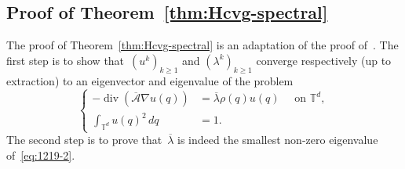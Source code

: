 \documentclass{article}
\renewcommand{\geq}{\geqslant}
\def\T{\mathbb{T}}
\renewcommand{\dim}{d}
\begin{document}
\subsection{Proof of Theorem~\ref{thm:Hcvg-spectral}}
\label{app:thm:Hcvg-spectral}

The proof of Theorem~\ref{thm:Hcvg-spectral} is an adaptation of the proof of~\cite[Theorem~1.3.16]{allaire_homogeneisation}. The first step is to show that~$(u^k)_{k \geq 1}$ and $(\lambda^k)_{k \geq 1}$ converge respectively (up to extraction) to an eigenvector and eigenvalue of the problem
\begin{equation}
  \label{eq:1219-2}
  \left\{\begin{aligned}
  -\operatorname{div}\left(\overline{\mathcal{A}}\nabla u(q)\right) & = \overline{\lambda}\rho(q)u(q) \quad \text{ on } \T^\dim,\\
  \int_{\T^\dim} u(q)^2 \, dq & = 1. 
  \end{aligned}\right.
\end{equation}
The second step is to prove that~$\overline{\lambda}$ is indeed the smallest non-zero eigenvalue of~\eqref{eq:1219-2}.
\end{document}
